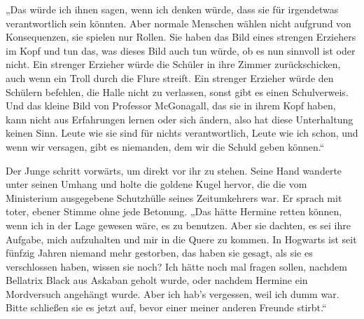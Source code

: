 „Das würde ich ihnen sagen, wenn ich denken würde, dass sie für irgendetwas verantwortlich sein könnten. Aber normale Menschen wählen nicht aufgrund von Konsequenzen, sie spielen nur Rollen. Sie haben das Bild eines strengen Erziehers im Kopf und tun das, was dieses Bild auch tun würde, ob es nun sinnvoll ist oder nicht. Ein strenger Erzieher würde die Schüler in ihre Zimmer zurückschicken, auch wenn ein Troll durch die Flure streift. Ein strenger Erzieher würde den Schülern befehlen, die Halle nicht zu verlassen, sonst gibt es einen Schulverweis. Und das kleine Bild von Professor McGonagall, das sie in ihrem Kopf haben, kann nicht aus Erfahrungen lernen oder sich ändern, also hat diese Unterhaltung keinen Sinn. Leute wie sie sind für nichts verantwortlich, Leute wie ich schon, und wenn wir versagen, gibt es niemanden, dem wir die Schuld geben können.“

Der Junge schritt vorwärts, um direkt vor ihr zu stehen. Seine Hand wanderte unter seinen Umhang und holte die goldene Kugel hervor, die die vom Ministerium ausgegebene Schutzhülle seines Zeitumkehrers war. Er sprach mit toter, ebener Stimme ohne jede Betonung.
„Das hätte Hermine retten können, wenn ich in der Lage gewesen wäre, es zu benutzen. Aber sie dachten, es sei ihre Aufgabe, mich aufzuhalten und mir in die Quere zu kommen. In Hogwarts ist seit fünfzig Jahren niemand mehr gestorben, das haben sie gesagt, als sie es verschlossen haben, wissen sie noch? Ich hätte noch mal fragen sollen, nachdem Bellatrix Black aus Askaban geholt wurde, oder nachdem Hermine ein Mordversuch angehängt wurde. Aber ich hab’s vergessen, weil ich dumm war. Bitte schließen sie es jetzt auf, bevor einer meiner anderen Freunde stirbt.“

